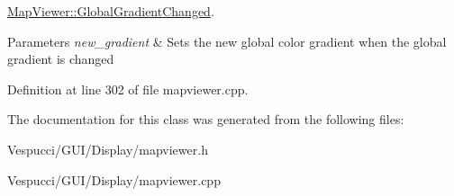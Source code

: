 \hyperlink{class_map_viewer_ad9fe700fcec6639713adb177c8775c6d}{Map\+Viewer\+::\+Global\+Gradient\+Changed}. 


\begin{DoxyParams}{Parameters}
{\em new\+\_\+gradient} & Sets the new global color gradient when the global gradient is changed \\
\hline
\end{DoxyParams}


Definition at line 302 of file mapviewer.\+cpp.



The documentation for this class was generated from the following files\+:\begin{DoxyCompactItemize}
\item 
Vespucci/\+G\+U\+I/\+Display/mapviewer.\+h\item 
Vespucci/\+G\+U\+I/\+Display/mapviewer.\+cpp\end{DoxyCompactItemize}
